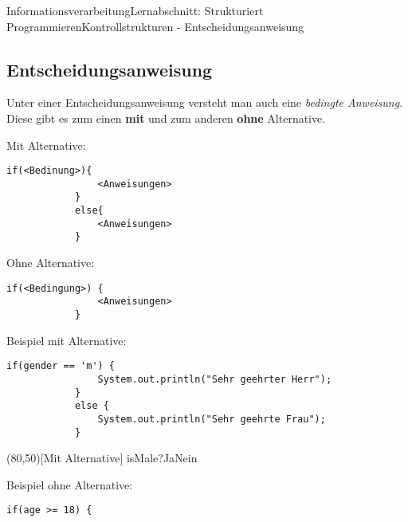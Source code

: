 \documentclass[11pt,oneside,openany,headings=optiontotoc,11pt,numbers=noenddot]{article}
\begin{document}
\begin{worksheet}{Informationsverarbeitung}{Lernabschnitt: Strukturiert Programmieren}{Kontrollstrukturen - Entscheidungsanweisung}
		\subsection{Entscheidungsanweisung}
		Unter einer Entscheidungsanweisung versteht man auch eine \textit{bedingte Anweisung}. Diese gibt es zum einen \textbf{mit} und zum anderen \textbf{ohne} Alternative.\\
		\begin{minipage}[t]{0.48\textwidth}
			\vspace*{0pt}
			Mit Alternative:
			\begin{lstlisting}[style=JavaInputStyle]
			if(<Bedinung>){
				<Anweisungen>
			}
			else{
				<Anweisungen>
			}
			\end{lstlisting}
		\end{minipage}
		\hfill
		\begin{minipage}[t]{0.48\textwidth}
			\vspace*{0pt}
			Ohne Alternative:
			\begin{lstlisting}[style=JavaInputStyle]
			if(<Bedingung>) {
				<Anweisungen>
			}
			\end{lstlisting}
		\end{minipage}
		\par\noindent
		\begin{minipage}[t]{0.48\textwidth}
			\vspace*{0pt}
			Beispiel mit Alternative:
			\begin{lstlisting}[style=JavaInputStyle,frame=single]
			if(gender == 'm') {
				System.out.println("Sehr geehrter Herr");
			}
			else {
				System.out.println("Sehr geehrte Frau");
			}
			\end{lstlisting}
		\end{minipage}
		\hfill
		\begin{minipage}[t]{0.48\textwidth}
			\vspace*{0pt}
			\begin{struktogramm}(80,50)[Mit Alternative]
				{isMale?}{Ja}{Nein}
				\change
				\ifend
			\end{struktogramm}
		\end{minipage}
		\begin{minipage}[t]{0.48\textwidth}
			\vspace*{0pt}
			Beispiel ohne Alternative:
			\begin{lstlisting}[style=JavaInputStyle,frame=single]
			if(age >= 18) {

\end{lstlisting}
\end{minipage}
\end{worksheet}
\end{document}
